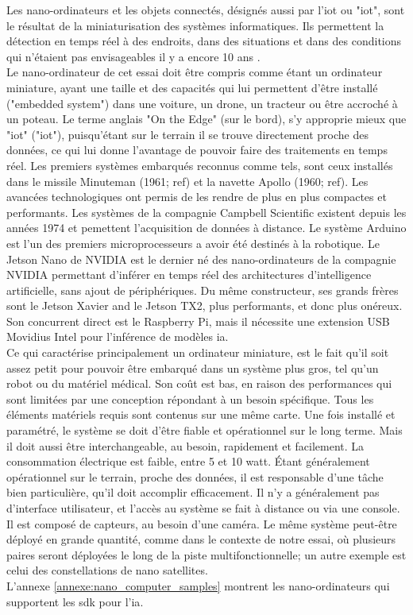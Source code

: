 ﻿\noindent Les nano-ordinateurs et les objets connectés, désignés aussi par l'\acrlong{iot} ou "\acrshort{iot}", \parencite{blanco-filgueira_deep_2019, sharma_history_2019} sont le résultat de la miniaturisation des systèmes informatiques. Ils permettent la détection en temps réel à des endroits, dans des situations et dans des conditions qui n'étaient pas envisageables il y a encore 10 ans \parencite{zheng_real-time_2020, bernas_edge_2017, abouzahir_iot-empowered_2017, blanco-filgueira_deep_2019}.
\vspace{0.5\baselineskip}
\\
\noindent Le nano-ordinateur de cet essai doit être compris comme étant un ordinateur miniature, ayant une taille et des capacités qui lui permettent d'être installé ("embedded system") dans une voiture, un drone, un tracteur ou être accroché à un poteau. Le terme anglais "On the Edge" (sur le bord), s'y approprie mieux que "\acrshort{iot}" ("\acrlong{iot}"), puisqu'étant sur le terrain il se trouve directement proche des données, ce qui lui donne l'avantage de pouvoir faire des traitements en temps réel. Les premiers systèmes embarqués reconnus comme tels, sont ceux installés dans le missile Minuteman (1961; ref) et la navette Apollo (1960; ref). Les avancées technologiques ont permis de les rendre de plus en plus compactes et performants. Les systèmes de la compagnie Campbell Scientific existent depuis les années 1974 et pemettent l'acquisition de données à distance. Le système Arduino est l'un des premiers microprocesseurs a avoir été destinés à la robotique. Le Jetson Nano de NVIDIA est le dernier né des nano-ordinateurs de la compagnie NVIDIA permettant d'inférer en temps réel des architectures d'intelligence artificielle, sans ajout de périphériques. Du même constructeur, ses grands frères sont le Jetson Xavier and le Jetson TX2, plus performants, et donc plus onéreux. Son concurrent direct est le Raspberry Pi, mais il nécessite une extension USB Movidius Intel pour l'inférence de modèles \acrshort{ia}. 
\vspace{0.5\baselineskip}
\\
\noindent Ce qui caractérise principalement un ordinateur miniature, est le fait qu'il soit assez petit pour pouvoir être embarqué dans un système plus gros, tel qu'un robot ou du matériel médical. Son coût est bas, en raison des performances qui sont limitées par une conception répondant à un besoin spécifique. Tous les éléments matériels requis sont contenus sur une même carte. Une fois installé et paramétré, le système se doit d'être fiable et opérationnel sur le long terme. Mais il doit aussi être interchangeable, au besoin, rapidement et facilement. La consommation électrique est faible, entre 5 et 10 watt. Étant généralement opérationnel sur le terrain, proche des données, il est responsable d'une tâche bien particulière, qu'il doit accomplir efficacement. Il n'y a généralement pas d'interface utilisateur, et l'accès au système se fait à distance ou via une console. Il est composé de capteurs, au besoin d'une caméra. Le même système peut-être déployé en grande quantité, comme dans le contexte de notre essai, où plusieurs paires seront déployées le long de la piste multifonctionnelle; un autre exemple est celui des constellations de nano satellites.
\vspace{0.5\baselineskip}
\\
\noindent L'annexe \ref{annexe:nano_computer_samples} montrent les nano-ordinateurs qui supportent les \acrshort{sdk} pour l'\acrshort{ia}.
